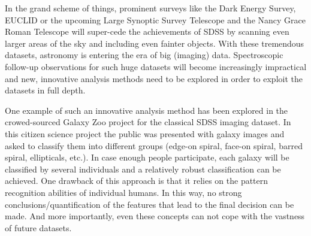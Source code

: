 \documentclass[conference]{IEEEtran}
\begin{document}
In the grand scheme of things, prominent surveys like the Dark Energy Survey, EUCLID or the upcoming Large Synoptic Survey Telescope and the Nancy Grace Roman Telescope will super-cede the achievements of SDSS by scanning even larger areas of the sky and including even fainter objects. With these tremendous datasets, astronomy is entering the era of big (imaging) data. Spectroscopic follow-up observations for such huge datasets will become increasingly impractical and new, innovative analysis methods need to be explored in order to exploit the datasets in full depth.

One example of such an innovative analysis method has been explored in the crowed-sourced Galaxy Zoo project \citep{galaxyzoo2008} for the classical SDSS imaging dataset. In this citizen science project the public was presented with galaxy images and asked to classify them into different groups (edge-on spiral, face-on spiral, barred spiral, ellipticals, etc.). In case enough people participate, each galaxy will be classified by several individuals and a relatively robust classification can be achieved. One drawback of this approach is that it relies on the pattern recognition abilities of individual humans. In this way, no strong conclusions/quantification of the features that lead to the final decision can be made. And more importantly, even these concepts can not cope with the vastness of future datasets.
\end{document}
